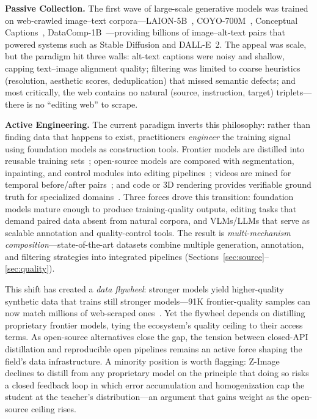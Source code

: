 \documentclass{llmxive}
\begin{document}
\textbf{Passive Collection.}
The first wave of large-scale generative models was trained on web-crawled image--text corpora---LAION-5B~\citep{schuhmann2022laion}, COYO-700M~\citep{kakaobrain2022coyo-700m}, Conceptual Captions~\citep{sharma2018conceptual}, DataComp-1B~\citep{gadre2023datacomp}---providing billions of image--alt-text pairs that powered systems such as Stable Diffusion and DALL-E~2. The appeal was scale, but the paradigm hit three walls: alt-text captions were noisy and shallow, capping text--image alignment quality; filtering was limited to coarse heuristics (resolution, aesthetic scores, deduplication) that missed semantic defects; and most critically, the web contains no natural (source, instruction, target) triplets---there is no ``editing web'' to scrape.

\textbf{Active Engineering.}
The current paradigm inverts this philosophy: rather than finding data that happens to exist, practitioners \emph{engineer} the training signal using foundation models as construction tools. Frontier models are distilled into reusable training sets~\citep{chen2025sharegpt, qian2025pico}; open-source models are composed with segmentation, inpainting, and control modules into editing pipelines~\citep{zhao2024ultraedit, ye2025imgedit, liu2025step1x}; videos are mined for temporal before/after pairs~\citep{chang2025bytemorph, zeng2025editworld}; and code or 3D rendering provides verifiable ground truth for specialized domains~\citep{zhuo2025factuality, kumari2025generating}. Three forces drove this transition: foundation models mature enough to produce training-quality outputs, editing tasks that demand paired data absent from natural corpora, and VLMs/LLMs that serve as scalable annotation and quality-control tools. The result is \emph{multi-mechanism composition}---state-of-the-art datasets combine multiple generation, annotation, and filtering strategies into integrated pipelines (Sections~\ref{sec:source}--\ref{sec:quality}).

This shift has created a \emph{data flywheel}: stronger models yield higher-quality synthetic data that trains still stronger models---91K frontier-quality samples can now match millions of web-scraped ones~\citep{chen2025sharegpt}. Yet the flywheel depends on distilling proprietary frontier models, tying the ecosystem's quality ceiling to their access terms. As open-source alternatives close the gap, the tension between closed-API distillation and reproducible open pipelines remains an active force shaping the field's data infrastructure. A minority position is worth flagging: Z-Image~\citep{cai2025z} declines to distill from any proprietary model on the principle that doing so risks a closed feedback loop in which error accumulation and homogenization cap the student at the teacher's distribution---an argument that gains weight as the open-source ceiling rises.
\end{document}
